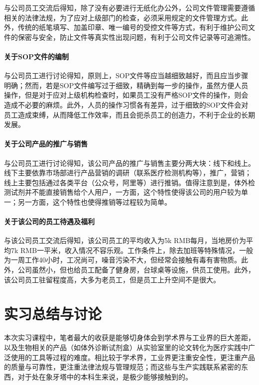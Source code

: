 与公司员工交流后得知，除了没有必要进行无纸化办公外，公司文件管理需要遵循相关的法律法规，为了应对上级部门的检查，必须采用规定的文件管理方式。此外，传统的纸笔填写、加盖印章、唯一编号的受控文件等方式，有利于维护公司文件的保密与安全，防止文件等真实性出现问题，有利于公司文件记录等可追溯性。

\paragraph{关于SOP文件的编制} 与公司员工进行讨论得知，原则上，SOP文件等应当越细致越好，而且应当步骤明确；然而，若是SOP文件编写过于细致，精确到每一步的操作，虽然方便人员操作，但是对于应对上级机构检查时，如果员工没有严格SOP文件的操作，则会造成不必要的麻烦。此外，人员的操作习惯各有差异，过于细致的SOP文件会对员工造成束缚，从而降低工作效率，而且会扼杀员工的创造力，不利于企业的长期发展。

\paragraph{关于公司产品的推广与销售} 与公司员工进行讨论得知，该公司产品的推广与销售主要分两大块：线下和线上。线下主要依靠市场部进行产品营销的调研（联系医疗检测机构等），推广，营销；线上主要包括通过各类平台（公众号，阿里等）进行推销。值得注意到是，体外检测试剂并不能直接销售给个人用户，一方面，这个特性使得该公司的用户较为单一；另一方面，这个特性也使得推销等过程较为简单。

\paragraph{关于该公司的员工待遇及福利} 与该公司员工交流后得知，该公司员工的平均收入为5k RMB每月，当地房价为平均7k RMB一平米，收入情况不容乐观。工作条件上，除去加班等特殊情况，一般为一周工作40小时，工况尚可，噪音污染不大，但经常会接触有毒有害物质。此外，公司虽然小，但也给员工配备了健身房，台球桌等设施，供员工使用。此外，该公司员工驻留程度高，大多为老员工，但是员工上升空间不是很大。



\section{实习总结与讨论}

本次实习课程中，笔者最大的收获是能够切身体会到学术界与工业界的巨大差距，以及生物相关的产品（如体外诊断试剂盒）从实验室里的论文转化为医疗实践中广泛使用的工具等过程的难度。相比较于学术界，工业界更注重安全性，更注重产品的质量与可靠性，更注重法律法规与管理规范；而这些与生产实践联系紧密的东西，对于处在象牙塔中的本科生来说，是极少能够接触到的。

